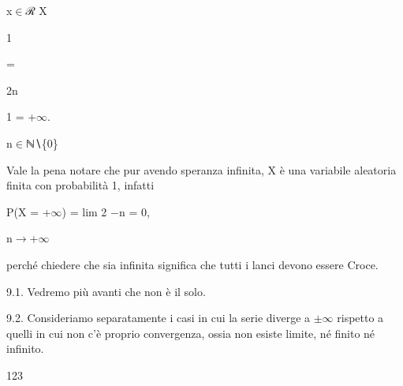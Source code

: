\documentclass[a4paper,portrait,12pt]{article}
\begin{document}
\begin{flushleft}
x$\in$ℛ X
\end{flushleft}





1


=


\begin{flushleft}
2n
\end{flushleft}





1 = +$\infty$.


\begin{flushleft}
n$\in$ℕ∖\{0\}
\end{flushleft}





\begin{flushleft}
Vale la pena notare che pur avendo speranza infinita, X \`{e} una variabile aleatoria finita con probabilit\`{a} 1, infatti
\end{flushleft}


\begin{flushleft}
P(X = +$\infty$) = lim 2 $-$n = 0,
\end{flushleft}


\begin{flushleft}
n$\rightarrow$+$\infty$
\end{flushleft}





\begin{flushleft}
perch\'{e} chiedere che sia infinita significa che tutti i lanci devono essere Croce.
\end{flushleft}


\begin{flushleft}
9.1. Vedremo più avanti che non \`{e} il solo.
\end{flushleft}


\begin{flushleft}
9.2. Consideriamo separatamente i casi in cui la serie diverge a $\pm$$\infty$ rispetto a quelli in cui non c'\`{e} proprio convergenza, ossia non esiste limite, n\'{e} finito n\'{e} infinito.
\end{flushleft}





123
\end{document}
